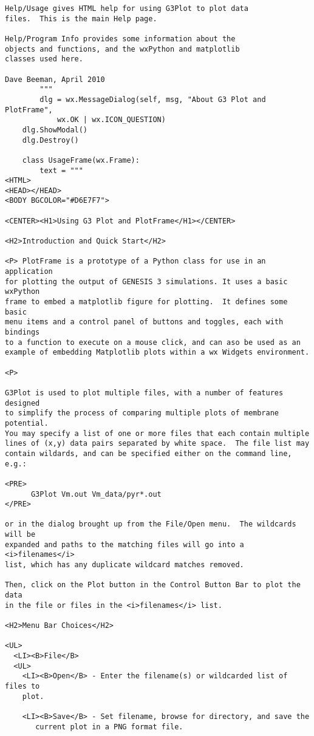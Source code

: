 \documentclass[12pt]{article}
\begin{document}
\begin{verbatim}
Help/Usage gives HTML help for using G3Plot to plot data
files.  This is the main Help page.

Help/Program Info provides some information about the
objects and functions, and the wxPython and matplotlib
classes used here.

Dave Beeman, April 2010
        """
        dlg = wx.MessageDialog(self, msg, "About G3 Plot and PlotFrame",
            wx.OK | wx.ICON_QUESTION)
	dlg.ShowModal()
	dlg.Destroy()

    class UsageFrame(wx.Frame):
        text = """
<HTML>
<HEAD></HEAD>
<BODY BGCOLOR="#D6E7F7">

<CENTER><H1>Using G3 Plot and PlotFrame</H1></CENTER>

<H2>Introduction and Quick Start</H2>

<P> PlotFrame is a prototype of a Python class for use in an application
for plotting the output of GENESIS 3 simulations. It uses a basic wxPython
frame to embed a matplotlib figure for plotting.  It defines some basic
menu items and a control panel of buttons and toggles, each with bindings
to a function to execute on a mouse click, and can aso be used as an
example of embedding Matplotlib plots within a wx Widgets environment.

<P>

G3Plot is used to plot multiple files, with a number of features designed
to simplify the process of comparing multiple plots of membrane potential.
You may specify a list of one or more files that each contain multiple
lines of (x,y) data pairs separated by white space.  The file list may
contain wildards, and can be specified either on the command line, e.g.:

<PRE>
      G3Plot Vm.out Vm_data/pyr*.out
</PRE>

or in the dialog brought up from the File/Open menu.  The wildcards will be
expanded and paths to the matching files will go into a <i>filenames</i>
list, which has any duplicate wildcard matches removed.

Then, click on the Plot button in the Control Button Bar to plot the data
in the file or files in the <i>filenames</i> list.

<H2>Menu Bar Choices</H2>

<UL>
  <LI><B>File</B>
  <UL>
    <LI><B>Open</B> - Enter the filename(s) or wildcarded list of files to
    plot.

    <LI><B>Save</B> - Set filename, browse for directory, and save the
	   current plot in a PNG format file.


\end{verbatim}
\end{document}
